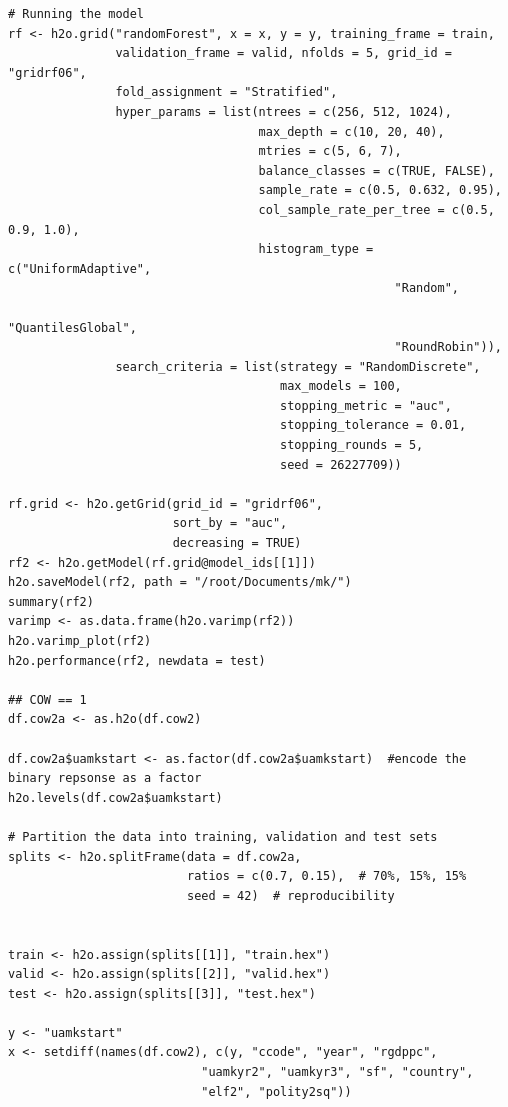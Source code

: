 \begin{verbatim}
# Running the model
rf <- h2o.grid("randomForest", x = x, y = y, training_frame = train, 
               validation_frame = valid, nfolds = 5, grid_id = "gridrf06",
               fold_assignment = "Stratified",
               hyper_params = list(ntrees = c(256, 512, 1024),
                                   max_depth = c(10, 20, 40),
                                   mtries = c(5, 6, 7),
                                   balance_classes = c(TRUE, FALSE),
                                   sample_rate = c(0.5, 0.632, 0.95),
                                   col_sample_rate_per_tree = c(0.5, 0.9, 1.0),
                                   histogram_type = c("UniformAdaptive",
                                                      "Random",
                                                      "QuantilesGlobal",
                                                      "RoundRobin")),
               search_criteria = list(strategy = "RandomDiscrete", 
                                      max_models = 100, 
                                      stopping_metric = "auc", 
                                      stopping_tolerance = 0.01, 
                                      stopping_rounds = 5, 
                                      seed = 26227709)) 

rf.grid <- h2o.getGrid(grid_id = "gridrf06",
                       sort_by = "auc",
                       decreasing = TRUE)
rf2 <- h2o.getModel(rf.grid@model_ids[[1]])
h2o.saveModel(rf2, path = "/root/Documents/mk/")
summary(rf2)
varimp <- as.data.frame(h2o.varimp(rf2))
h2o.varimp_plot(rf2)
h2o.performance(rf2, newdata = test)

## COW == 1
df.cow2a <- as.h2o(df.cow2)

df.cow2a$uamkstart <- as.factor(df.cow2a$uamkstart)  #encode the binary repsonse as a factor
h2o.levels(df.cow2a$uamkstart)

# Partition the data into training, validation and test sets
splits <- h2o.splitFrame(data = df.cow2a, 
                         ratios = c(0.7, 0.15),  # 70%, 15%, 15%
                         seed = 42)  # reproducibility


train <- h2o.assign(splits[[1]], "train.hex")   
valid <- h2o.assign(splits[[2]], "valid.hex") 
test <- h2o.assign(splits[[3]], "test.hex")

y <- "uamkstart"
x <- setdiff(names(df.cow2), c(y, "ccode", "year", "rgdppc",
                           "uamkyr2", "uamkyr3", "sf", "country",
                           "elf2", "polity2sq")) 


\end{verbatim}
